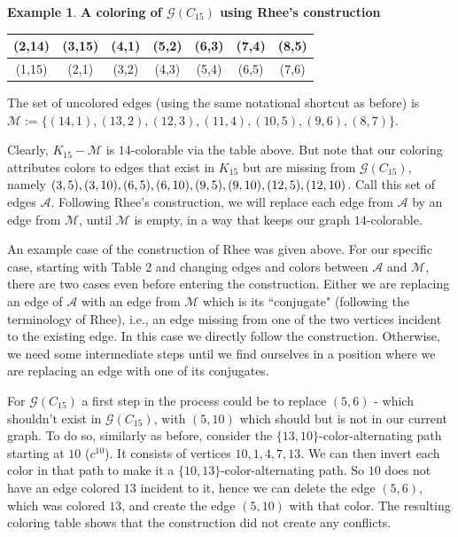 \documentclass{article}
\theoremstyle{definition}
\newtheorem{example}[theorem]{Example}
\theoremstyle{indentclaim}
\theoremstyle{named}
\theoremstyle{named}
\begin{document}
\begin{example}{\textbf{A coloring of $\mathscr{G}(C_{15})$ using Rhee's construction}}
\begin{table}[ht]
{\begin{tabular}[t]{|C|C|C|C|C|C|C|}
(2,14)& (3,15)& (4,1)&(5,2) & (6,3)&(7,4) & (8,5) \\ \hline
 
(1,15)& (2,1)& (3,2)& (4,3)& (5,4) & (6,5) & (7,6) \\ \hline
\end{tabular}

}
\end{table}


The set of uncolored edges (using the same notational shortcut as before) is $\mathcal{M} := \{(14,1), (13,2), (12,3), (11,4), (10,5), (9,6), (8,7) \}$. 

Clearly, $K_{15} - \mathcal{M}$ is $14$-colorable via the table above. But note that our coloring attributes colors to edges that exist in $K_{15}$ but are missing from $\mathscr{G}(C_{15})$, namely $(3,5), (3,10), (6,5), (6,10), \\ (9,5), (9, 10), (12,5), (12,10)$. Call this set of edges $\mathcal{A}$. Following Rhee's construction, we will replace each edge from $\mathcal{A}$ by an edge from $\mathcal{M}$, until $\mathcal{M}$ is empty, in a way that keeps our graph $14$-colorable. 

An example case of the construction of Rhee was given above. For our specific case, starting with Table 2 and changing edges and colors between $\mathcal{A}$ and $\mathcal{M}$, there are two cases even before entering the construction. Either we are replacing an edge of $\mathcal{A}$ with an edge from $\mathcal{M}$ which is its ``conjugate" (following the terminology of Rhee), i.e., an edge missing from one of the two vertices incident to the existing edge. In this case we directly follow the construction. Otherwise, we need some intermediate steps until we find ourselves in a position where we are replacing an edge with one of its conjugates. 

For $\mathscr{G}(C_{15})$ a first step in the process could be to replace $(5, 6)$ - which shouldn't exist in $\mathscr{G}(C_{15})$, with $(5, 10)$ which should but is not in our current graph. To do so, similarly as before, consider the $\{13, 10\}$-color-alternating path starting at $10$ ($c^{10}$). It consists of vertices $10, 1, 4, 7, 13$. We can then invert each color in that path to make it a $\{10, 13\}$-color-alternating path. So $10$ does not have an edge colored $13$ incident to it, hence we can delete the edge $(5, 6)$, which was colored $13$, and create the edge $(5, 10)$ with that color. The resulting coloring table shows that the construction did not create any conflicts. 



\end{example}
\end{document}
